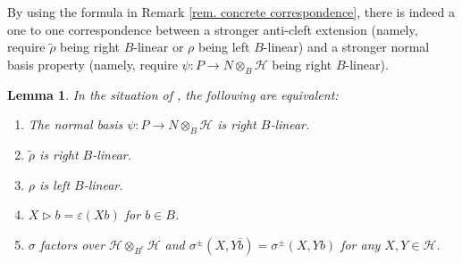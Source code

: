\documentclass[a4paper,reqno]{amsart}
\numberwithin{equation}{section}
\theoremstyle{plain}
\newtheorem{lem}[thm]{Lemma}
\theoremstyle{remark}
\numberwithin{equation}{section}
\newcommand{\ot}{\otimes}
\newcommand\ol{\overline}
\newcommand{\trho}{{\tilde{\rho}}}
\newcommand\ou[1]{\otimes_{#1}}
\newcommand{\la}{{\triangleright}}
\newcommand{\CH}{\mathcal{H}}
\begin{document}
By using the formula in Remark \ref{rem. concrete correspondence},  there is indeed a one to one correspondence between a stronger anti-cleft extension (namely, require $\trho$ being right $B$-linear or $\rho$ being left $B$-linear) and a stronger normal basis property (namely, require $\psi:P\to N\ot_{B}\CH$ being right $B$-linear).
\begin{lem}\label{rem. bilinear 2-cocycle of L over N}
  In the situation of , the following are equivalent: 
  \begin{enumerate}
      \item The normal basis $\psi\colon P\to N\ou B\CH$ is right $B$-linear.
      \item $\trho$ is right $B$-linear.
      \item $\rho$ is left $B$-linear.
      \item $X\la b=\varepsilon(Xb)$ for $b\in B$.
      \item $\sigma$ factors over $\CH\ou{B^e}\CH$ and $\sigma^{\pm}(X, Y\ol b)=\sigma^{\pm}(X, Y b)$ for any $X, Y\in\CH$.
  \end{enumerate}
  \end{lem}
\end{document}
